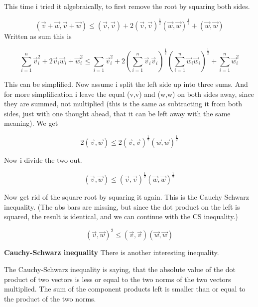 \documentclass[a4paper]{article}
\begin{document}
\begin{Example}
 This time i tried it algebraically, to first remove the root by squaring both sides. 

\begin{displaymath}
(\vec{v}+\vec{w}, \vec{v}+\vec{w}) \leq (\vec{v},\vec{v}) + 2(\vec{v},\vec{v})^{\frac{1}{2}}(\vec{w},\vec{w})^{\frac{1}{2}} + (\vec{w},\vec{w})
\end{displaymath}
Written as sum this is

\begin{displaymath}
\sum_{i=1}^{n}\vec{v}_{i}^{2}+2\vec{v}_{i}\vec{w}_{i}+\vec{w}_{i}^{2} \leq \sum_{i=1}\vec{v}_{i}^{2}+2(\sum_{i=1}^{n}\vec{v}_{i}\vec{v}_{i})^{\frac{1}{2}}(\sum_{i=1}^{n}\vec{w}_{i}\vec{w}_{i})^{\frac{1}{2}}+\sum_{i=1}^{n}\vec{w}_{i}^{2}
\end{displaymath}

This can be simplified. Now assume i split the left side up into three sums. And for more simplification i leave the equal (v,v) and (w,w) on both sides away, since they are summed, not multiplied (this is the same as subtracting it from both sides, just with one thought ahead, that it can be left away with the same meaning). We get

\begin{displaymath}
2(\vec{v},\vec{w}) \leq 2(\vec{v},\vec{v})^{\frac{1}{2}}(\vec{w},\vec{w})^{\frac{1}{2}}
\end{displaymath}

Now i divide the two out. 

\begin{displaymath}
(\vec{v},\vec{w}) \leq (\vec{v},\vec{v})^{\frac{1}{2}}(\vec{w},\vec{w})^{\frac{1}{2}}
\end{displaymath}

Now get rid of the square root by squaring it again. This is the Cauchy Schwarz inequality. (The abs bars are missing, but since the dot product on the left is squared, the result is identical, and we can continue with the CS inequality.)


\begin{displaymath}
(\vec{v},\vec{w})^{2} \leq (\vec{v},\vec{v})(\vec{w},\vec{w})
\end{displaymath}


\textbf{Cauchy-Schwarz inequality} There is another interesting inequality.

The Cauchy-Schwarz inequality is saying, that the absolute value of the dot product of two vectors is less or equal to the two norms of the two vectors multiplied. The sum of the component products left is smaller than or equal to the product of the two norms.\\


\end{Example}
\end{document}
